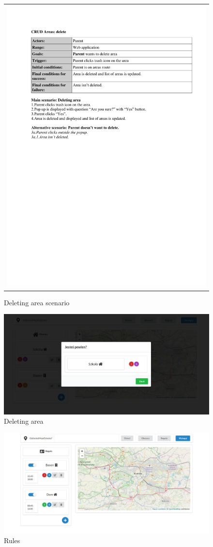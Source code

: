 \documentclass{sprawozdanie-agh}
\begin{document}
		\begin{figure}[H] 
			\centering
			\begin{tabular}{c}
				\includegraphics[width=.80\textwidth]{areaDelete} 
			\end{tabular} 
		\caption{Deleting area scenario}
		\end{figure}

		\begin{figure}[H]
			\centering
			\includegraphics[width=.80\textwidth]{deleteArea}
			\caption{Deleting area}
		\end{figure}

		\begin{figure}[H]
			\centering
			\includegraphics[width=.80\textwidth]{rules}
			\caption{Rules}
		\end{figure}
\end{document}
